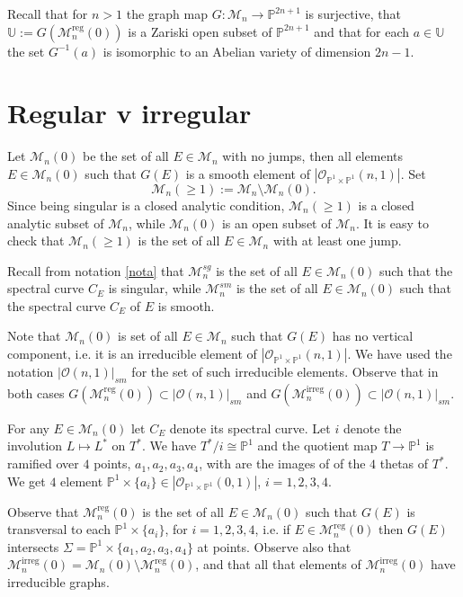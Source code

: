 \documentclass[
  a4paper, 
  reqno, 
  oneside, 
  11pt
]{amsart}
\theoremstyle{plain}	%
\theoremstyle{mydef} %
\theoremstyle{remark}
\theoremstyle{definition}
\theoremstyle{remark}
\DeclareMathOperator{\reg}{reg}
\DeclareMathOperator{\irreg}{irreg}
\begin{document}
Recall that for $n>1$ 
the graph map $G\colon\mathcal M_n\to \mathbb P^{2n+1}$ is surjective, that $\mathbb U:= G(\mathcal M_n^{\reg}(0))$  is a Zariski open subset of $\mathbb P^{2n+1}$ and that for each $a\in \mathbb U$ the set $G^{-1}(a)$ is isomorphic to an Abelian variety of dimension $2n-1$. 




\section{Regular v irregular}\label{irregVreg}

Let $\mathcal M_n(0)$ be the set of all $E\in \mathcal M_n$ with no jumps, then all elements 
$E\in \mathcal M_n(0)$ such that $G(E)$ is a smooth element of $|\mathcal O_{\mathbb P^1\times \mathbb P^1}(n,1)|$.
Set $$\mathcal M_n(\ge 1):= \mathcal M_n\setminus \mathcal M_n(0).$$ 
Since being singular is a closed analytic condition, $\mathcal M_n(\ge 1)$ is a closed analytic subset of $\mathcal M_n$, while $\mathcal M_n(0)$ is an open subset of $\mathcal M_n$. It is easy to check  that 
$\mathcal M_n(\ge 1)$ is the set of all $E\in \mathcal M_n$ with at least one jump.

Recall from notation \ref{nota} that  $\mathcal M_n^{sg}$ is the set of all $E\in \mathcal M_n(0)$ such that 
the spectral curve $C_E$ is singular, while $\mathcal M_n^{sm}$ is the set of all $E\in \mathcal M_n(0)$ 
such that the spectral curve $C_E$ of $E$ is smooth.

Note that $\mathcal M_n(0)$ is set of all $E\in \mathcal M_n$ such that $G(E)$ has no vertical component, i.e. it is an irreducible element of $|\mathcal O_{\mathbb P^1\times \mathbb P^1}(n,1)|$. We have used the notation 
$|\mathcal O(n,1)|_{sm}$ for  the set of such irreducible elements. Observe that  in both cases  
 $G(\mathcal M_n^{\reg}(0)) \subset |\mathcal O(n,1)|_{sm}$ and 
$G(\mathcal M_n^{\irreg}(0)) \subset |\mathcal O(n,1)|_{sm}$.

For any $E\in \mathcal M_n(0)$ let $C_E$ denote its spectral curve.
Let $i$ denote the involution $L\mapsto L^*$ on $T^*$. We have $T^*/i\cong \mathbb P^1$ and the quotient map $T\to \mathbb P^1$ is ramified over $4$ points, $a_1,a_2,a_3,a_4$, with are the images of of the $4$ thetas of $T^*$. We get $4$ element $\mathbb P^1\times \{a_i\}\in |\mathcal O_{\mathbb P^1\times \mathbb P^1}(0,1)|$, $i=1,2,3,4$.

Observe that  $\mathcal M_n^{\reg}(0)$ is  the set of all $E\in \mathcal M_n(0)$ such that $G(E)$ is transversal to each $\mathbb P^1\times \{a_i\}$, for $i=1,2,3,4$, i.e. if $E\in \mathcal M_n^{\reg}(0)$ then
$G(E)$ intersects $\Sigma =\mathbb P^1\times \{a_1,a_2,a_3,a_4\}$ at points. 
 Observe also that $\mathcal M_n^{\irreg}(0)= \mathcal M_n(0)\setminus \mathcal M_n^{\reg}(0)$, and that
all that elements of $\mathcal M_n^{\irreg}(0)$ have irreducible graphs.
\end{document}
